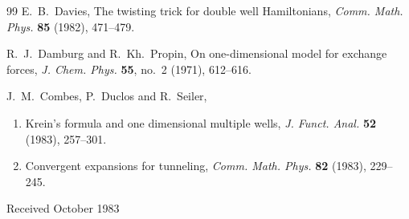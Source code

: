 \documentclass[11pt,a4paper]{article}
\numberwithin{equation}{section}
\theoremstyle{remark}
\begin{document}
\begin{thebibliography}{99}
E.~B.~Davies,
The twisting trick for double well Hamiltonians,
\emph{Comm. Math. Phys.} \textbf{85} (1982), 471--479.

R.~J.~Damburg and R.~Kh.~Propin,
On one-dimensional model for exchange forces,
\emph{J. Chem. Phys.} \textbf{55}, no.~2 (1971), 612--616.

J.~M.~Combes, P.~Duclos and R.~Seiler,
\begin{enumerate}[label=\arabic*.]
\item Krein's formula and one dimensional multiple wells,
\emph{J. Funct. Anal.} \textbf{52} (1983), 257--301.
\item Convergent expansions for tunneling,
\emph{Comm. Math. Phys.} \textbf{82} (1983), 229--245.
\end{enumerate}
\end{thebibliography}

\begin{flushright}
Received October 1983
\end{flushright}
\end{document}
